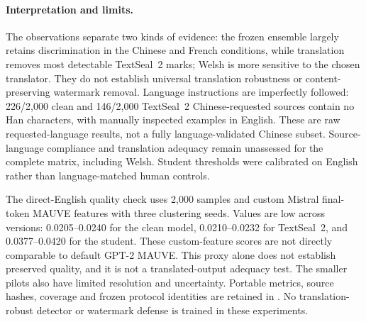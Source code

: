 \paragraph{Interpretation and limits.}
The observations separate two kinds of evidence: the frozen ensemble largely
retains discrimination in the Chinese and French conditions, while translation
removes most detectable TextSeal~2 marks; Welsh is more sensitive to the chosen
translator. They do not establish universal translation robustness or
content-preserving watermark removal. Language instructions are imperfectly
followed: 226/2,000 clean and 146/2,000 TextSeal~2 Chinese-requested sources
contain no Han characters, with manually inspected examples in English.
These are raw requested-language results, not a fully language-validated
Chinese subset. Source-language compliance and translation adequacy remain
unassessed for the complete matrix, including Welsh. Student thresholds were
calibrated on English rather than language-matched human controls.

The direct-English quality check uses 2,000 samples and custom Mistral
final-token MAUVE features with three clustering seeds. Values are low across
versions: 0.0205--0.0240 for the clean model, 0.0210--0.0232 for TextSeal~2,
and 0.0377--0.0420 for the student. These custom-feature scores are not directly
comparable to default GPT-2 MAUVE. This proxy alone does not establish preserved quality, and it is
not a translated-output adequacy test. The smaller pilots also have limited
resolution and uncertainty. Portable metrics, source hashes, coverage and
frozen protocol identities are retained in
. No translation-robust
detector or watermark defense is trained in these experiments.
